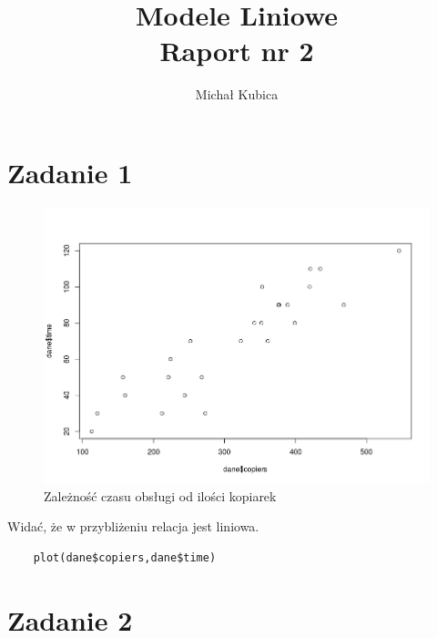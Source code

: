 \documentclass[9pt]{article}  %
\begin{document}
\author{Michał Kubica}
\title{Modele Liniowe \\ Raport nr 2}       
\maketitle                     %

\section{Zadanie 1}            %

    \begin{figure}[H]
      \centering
      \includegraphics[width=1\textwidth]{1.png}
      \caption {Zależność czasu obsługi od ilości kopiarek}
    \end{figure} 

  Widać, że w przybliżeniu relacja jest liniowa.
  

    \begin{lstlisting}
    plot(dane$copiers,dane$time)
    \end{lstlisting}  

    
\section{Zadanie 2}
\end{document}
